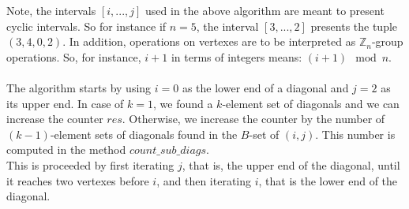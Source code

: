 \documentclass[17pt]{extarticle}
\begin{document}
Note, the intervals $[i, ..., j]$ used in the above algorithm are meant to present cyclic intervals.
So for instance if $n=5$, the interval $[3, ..., 2]$ presents the tuple $(3, 4, 0, 2)$.
In addition, operations on vertexes are to be interpreted as $\mathbb{Z}_n$-group operations.
So, for instance, $i+1$ in terms of integers means: $(i+1)\mod n$.\\ \\
The algorithm starts by using $i=0$ as the lower end of a diagonal and $j=2$ as its upper end.
In case of $k=1$, we found a $k$-element set of diagonals and we can increase the counter $res$.
Otherwise, we increase the counter by the number of $(k-1)$-element sets of diagonals found in the
$B$-set of $(i,j)$. This number is computed in the method $count\_sub\_diags$.\\
This is proceeded by first iterating $j$, that is, the upper end of the diagonal, until it reaches two vertexes 
before $i$, and then iterating $i$, that is the lower end of the diagonal.
\end{document}
